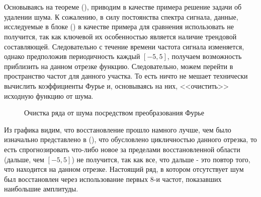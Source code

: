 \\\\
\indent Основываясь на теореме (), приводим в качестве примера решение задачи об удалении шума. К сожалению, в силу постоянства спектра сигнала, данные, исследуемые в блоке () в качестве примера для сравнения использовать не получится, так как ключевой их особенностью является наличие трендовой составляющей. Следовательно с течение времени частота сигнала изменяется, однако предположив периодичность каждый $[-5, 5]$, получаем возможность приблизить на данном отрезке функцию. Следовательно, можем перейти в пространство частот для данного участка. То есть ничто не мешает технически вычислить коэффициенты Фурье и, основываясь на них, <<очистить>> исходную функцию от шума.
\begin{figure}[H]
	\centering
	\caption{Очистка ряда от шума посредством преобразования Фурье}
\end{figure}
Из графика видим, что восстановление прошло намного лучше, чем было изначально представлено в (), что обусловлено цикличностью данного отрезка, то есть спрогнозировать что-либо новое за пределами восстановленной области (дальше, чем $[-5, 5]$) не получится, так как все, что дальше - это повтор того, что находится на данном отрезке. Настоящий ряд, в котором отсутствует шум был восстановлен через  использование первых $8$-и частот, показавших наибольшие амплитуды.

